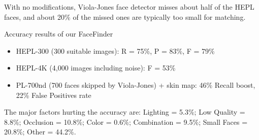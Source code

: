 
\begin{xpsectionbox}{}{}
With no modifications, Viola-Jones face detector misses about half of the HEPL faces, and about 20\% of the missed ones are typically too small for matching.

Accuracy results of our FaceFinder
\begin{itemize}
	\item HEPL-300 (300 suitable images): R = 75\%, P = 83\%, F = 79\%
	\item HEPL-4K (4,000 images including noise): F = 53\%
	\item PL-700nd (700 faces skipped by Viola-Jones) + skin map: 46\% Recall boost, 22\% False Positives rate
\end{itemize}
The major factors hurting the accuracy are: Lighting = 5.3\%; Low Quality = 8.8\%; Occlusion = 10.8\%; Color = 0.6\%; Combination = 9.5\%; Small Faces = 20.8\%; Other = 44.2\%.
\end{xpsectionbox}


